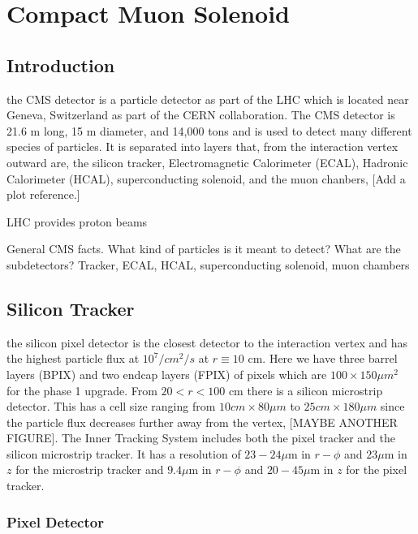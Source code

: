 \chapter{Compact Muon Solenoid}
\label{ch:CMS}

\section{Introduction}
\label{sec:cmsIntro}

the CMS detector is a particle detector as part of the LHC which is located near Geneva, Switzerland as part of the CERN collaboration. The CMS detector is 21.6 m long, 15 m diameter, and 14,000 tons and is used to detect many different species of particles. It is separated into layers that, from the interaction vertex outward are, the silicon tracker, Electromagnetic Calorimeter (ECAL), Hadronic Calorimeter (HCAL), superconducting solenoid, and the muon chanbers, [Add a plot reference.]

LHC provides proton beams

General CMS facts. What kind of particles is it meant to detect? What are the subdetectors? Tracker, ECAL, HCAL, superconducting solenoid, muon chambers

\section{Silicon Tracker}
\label{sec:Tracker}

the silicon pixel detector is the closest detector to the interaction vertex and has the highest particle flux at $10^7/cm^2/s$ at $r\equiv10$ cm. Here we have three barrel layers (BPIX) and two endcap layers (FPIX) of pixels which are $100\times150 \mu m^2$ for the phase 1 upgrade. From $20<r<100$ cm there is a silicon microstrip detector. This has a cell size ranging from $10 cm\times80 \mu m$ to $25 cm\times 180 \mu m$ since the particle flux decreases further away from the vertex, [MAYBE ANOTHER FIGURE]. The Inner Tracking System includes both the pixel tracker and the silicon microstrip tracker. It has a resolution of $23-24 \mu$m in $r-\phi$ and $23 \mu$m in $z$ for the microstrip tracker and $9.4 \mu$m in $r-\phi$ and $20-45 \mu$m in $z$ for the pixel tracker. 

\subsection{Pixel Detector}
\label{subsec:Pixel}

